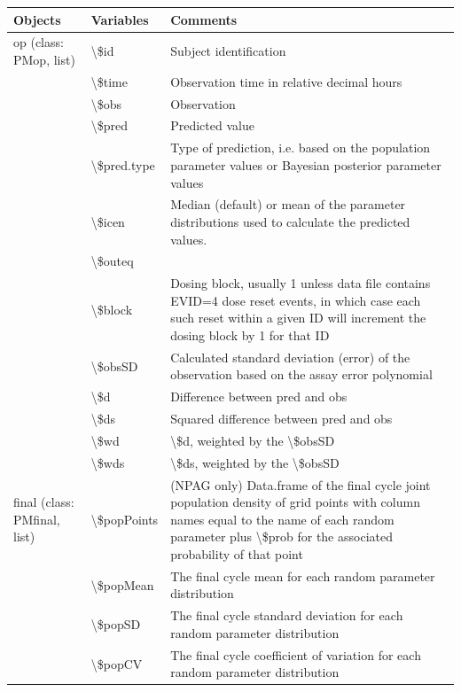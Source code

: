 \documentclass[
]{book}
\begin{document}
\begin{tabular}{l|l|l}
\hline
Objects & Variables & Comments\\
\hline
op (class: PMop, list) & \textbackslash{}\$id & Subject identification\\
\hline
 & \textbackslash{}\$time & Observation time in relative decimal hours\\
\hline
 & \textbackslash{}\$obs & Observation\\
\hline
 & \textbackslash{}\$pred & Predicted value\\
\hline
 & \textbackslash{}\$pred.type & Type of prediction, i.e. based on the population parameter values or Bayesian posterior parameter values\\
\hline
 & \textbackslash{}\$icen & Median (default) or mean of the parameter distributions used to calculate the predicted values.\\
\hline
 & \textbackslash{}\$outeq & \\
\hline
 & \textbackslash{}\$block & Dosing block, usually 1 unless data file contains EVID=4 dose reset events, in which case each such reset within a given ID will increment the dosing block by 1 for that ID\\
\hline
 & \textbackslash{}\$obsSD & Calculated standard deviation (error) of the observation based on the assay error polynomial\\
\hline
 & \textbackslash{}\$d & Difference between pred and obs\\
\hline
 & \textbackslash{}\$ds & Squared difference between pred and obs\\
\hline
 & \textbackslash{}\$wd & \textbackslash{}\$d, weighted by the \textbackslash{}\$obsSD\\
\hline
 & \textbackslash{}\$wds & \textbackslash{}\$ds, weighted by the \textbackslash{}\$obsSD\\
\hline
final (class: PMfinal, list) & \textbackslash{}\$popPoints & (NPAG only) Data.frame of the final cycle joint population density of grid points with column names equal to the name of each random parameter plus \textbackslash{}\$prob for the associated probability of that point\\
\hline
 & \textbackslash{}\$popMean & The final cycle mean for each random parameter distribution\\
\hline
 & \textbackslash{}\$popSD & The final cycle standard deviation for each random parameter distribution\\
\hline
 & \textbackslash{}\$popCV & The final cycle coefficient of variation for each random parameter distribution\\

\end{tabular}
\end{document}
